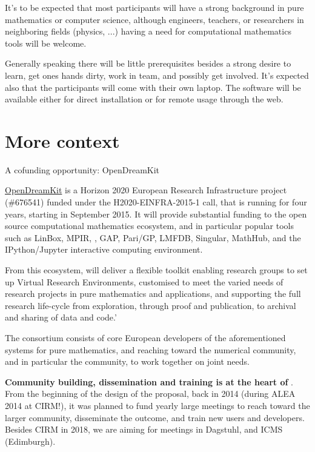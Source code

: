 \documentclass[12pt]{amsart}
\makeatletter
\def\subsection{\@startsection{subsection}{2}%
  \z@{.3\linespacing\@plus.5\linespacing}{.1\linespacing}%
  {\normalfont\bfseries}}
\makeatother
\begin{document}
It's to be expected that most participants will have a strong
background in pure mathematics or computer science, although
engineers, teachers, or researchers in neighboring fields (physics,
...) having a need for computational mathematics tools will be
welcome.

Generally speaking there will be little prerequisites besides a strong
desire to learn, get ones hands dirty, work in team, and possibly get
involved. It's expected also that the participants will come with
their own laptop. The software will be available either for direct
installation or for remote usage through the web.

\section{More context}

\subsection{A cofunding opportunity: OpenDreamKit}

\href{http://opendreamkit.org}{OpenDreamKit} is a Horizon 2020
European Research Infrastructure project (\#676541) funded under the
H2020-EINFRA-2015-1 call, that is running for four years, starting in
September 2015. It will provide substantial funding to the open source
computational mathematics ecosystem, and in particular popular tools
such as LinBox, MPIR, \Sage, GAP, Pari/GP, LMFDB, Singular,
MathHub, and the IPython/Jupyter interactive computing environment.

From this ecosystem, \ODK will deliver a flexible toolkit enabling
research groups to set up Virtual Research Environments, customised to
meet the varied needs of research projects in pure mathematics and
applications, and supporting the full research life-cycle from
exploration, through proof and publication, to archival and sharing of
data and code.'

The \ODK  consortium consists of core European developers of the
aforementioned systems for pure mathematics, and reaching toward the
numerical community, and in particular the \Jupyter  community, to work
together on joint needs.

\textbf{Community building, dissemination and training is at the heart
  of \ODK}. From the beginning of the design of the proposal, back in
2014 (during ALEA 2014 at CIRM!), it was planned to fund yearly large
meetings to reach toward the larger community, disseminate the
outcome, and train new users and developers. Besides CIRM in 2018, we
are aiming for meetings in Dagstuhl, and ICMS (Edimburgh).
\end{document}

